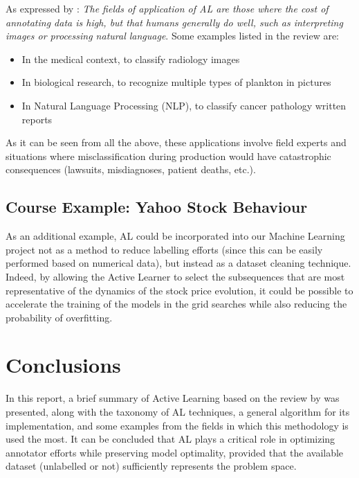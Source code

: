 \documentclass{scrartcl}
\begin{document}
  As expressed by \textcite{mosqueira2023human}: \emph{The fields of application of AL are those where the cost of annotating data is high, but that humans generally do well, such as interpreting images or processing natural language}. Some examples listed in the review are:
  \begin{itemize}
    \item In the medical context, to classify radiology images \autocite{hoi2006batch,nguyen2014supervised}
    \item In biological research, to recognize multiple types of plankton in pictures \autocite{luo2005active}
    \item In Natural Language Processing (NLP), to classify cancer pathology written reports \autocite{de2021deep}
  \end{itemize}
  As it can be seen from all the above, these applications involve field experts and situations where misclassification during production would have catastrophic consequences (lawsuits, misdiagnoses, patient deaths, etc.).

  \subsection{Course Example: Yahoo Stock Behaviour} \label{subsec:stock_example}

    As an additional example, AL could be incorporated into our Machine Learning project not as a method to reduce labelling efforts (since this can be easily performed based on numerical data), but instead as a dataset cleaning technique. Indeed, by allowing the Active Learner to select the subsequences that are most representative of the dynamics of the stock price evolution, it could be possible to accelerate the training of the models in the grid searches while also reducing the probability of overfitting.

\section{Conclusions} \label{sec:conclusions}

  In this report, a brief summary of Active Learning based on the review by \textcite{mosqueira2023human} was presented, along with the taxonomy of AL techniques, a general algorithm for its implementation, and some examples from the fields in which this methodology is used the most. It can be concluded that AL plays a critical role in optimizing annotator efforts while preserving model optimality, provided that the available dataset (unlabelled or not) sufficiently represents the problem space.

\printbibliography
\end{document}
